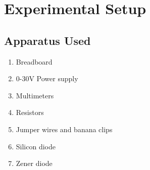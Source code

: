 \section{Experimental Setup}

\subsection{Apparatus Used}

\begin{enumerate}
    \item Breadboard
    \item 0-30V Power supply
    \item Multimeters
    \item Resistors
    \item Jumper wires and banana clips
    \item Silicon diode
    \item Zener diode
\end{enumerate}

